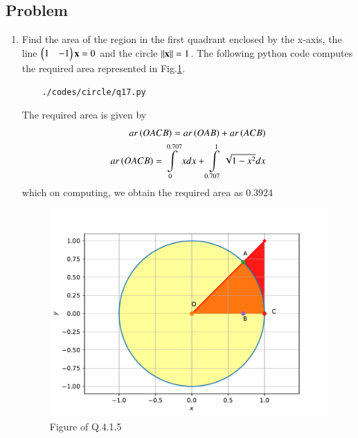 \subsection{Problem}

\renewcommand{\theequation}{\theenumi}
\begin{enumerate}[label=\thesection.\arabic*.,ref=\thesection.\theenumi]
\item Find the area of the region in the first quadrant enclosed by the x-axis, the line $\begin{pmatrix}1&-1\end{pmatrix}\mathbf{x}=0$ and the circle $\left\lVert\mathbf{x}\right\rVert=1$.
The following python code computes the required area represented in Fig.\ref{fig:qseventeen}.
	\begin{lstlisting}
	./codes/circle/q17.py
	\end{lstlisting}
	
\solution The required area is given by
\begin{align} 
ar\left(OACB\right) = ar\left(OAB\right) + ar\left(ACB\right)\\
ar\left(OACB\right) = \int\limits_{0}^{0.707} x dx + \int\limits_{0.707}^{1} \sqrt{1-x^2}dx
\end{align}
which on computing, we obtain the required area as 0.3924
\begin{figure}[!ht]
	\centering
	\includegraphics[width=\columnwidth]{./figs/circle/q17.pdf}
	\caption{Figure of Q.4.1.5}
	\label{fig:qseventeen}	
	\end{figure}
	
\end{enumerate}
